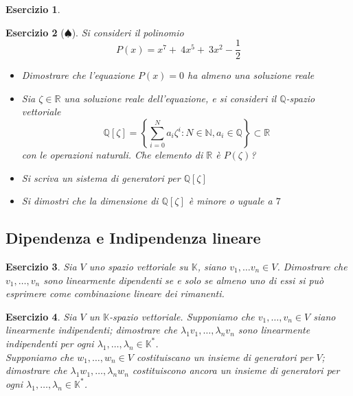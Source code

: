 \documentclass{article}
\newtheorem{es}{Esercizio}
\begin{document}
{\begin{es}
    
    
\end{es}





\begin{es}[$\spadesuit$]
    Si consideri il polinomio $$
    P(x)=x^7+\ 4x^5+\ 3x^2-\frac{1}{2}$$
    \begin{itemize}
        \item Dimostrare che l'equazione $P(x)=0$ ha almeno una soluzione reale
        \item Sia $\zeta\in\mathbb{R}$ una soluzione reale dell'equazione, e si consideri il $\mathbb{Q}$-spazio vettoriale
        $$\mathbb{Q}[\zeta]=\left\{\sum_{i=0}^N a_i\zeta^i:N\in \mathbb{N}, a_i\in \mathbb{Q}\right\}\subset \mathbb{R}$$
        con le operazioni naturali. Che elemento di $\mathbb{R}$ è $P(\zeta)$?
        \item Si scriva un sistema di generatori per $\mathbb{Q}[\zeta]$
        \item Si dimostri che la dimensione di $\mathbb{Q}[\zeta]$ è minore o uguale a $7$
    \end{itemize}
\end{es}



\subsection{Dipendenza e Indipendenza lineare}
\begin{es}
    Sia $V$ uno spazio vettoriale su $\mathbb{K}$, siano $v_1,\dots v_n \in V$. Dimostrare che $v_1,\dots, v_n$ sono linearmente dipendenti se e solo se almeno uno di essi si può esprimere come combinazione lineare dei rimanenti.
\end{es}

\begin{es}
    Sia $V$ un $\mathbb{K}$-spazio vettoriale. Supponiamo che $v_1,\dots, v_n \in V$ siano linearmente indipendenti; dimostrare che $\lambda_1v_1,\dots ,\lambda_nv_n$ sono linearmente indipendenti per ogni $\lambda_1,\dots ,\lambda_n \in \mathbb{K}^*$.\\
    Supponiamo che $w_1,\dots, w_n \in V$ costituiscano un insieme di generatori per $V$; dimostrare che $\lambda_1w_1,\dots ,\lambda_nw_n$ costituiscono ancora un insieme di generatori per ogni $\lambda_1,\dots ,\lambda_n \in \mathbb{K}^*$.
    
\end{es}



}
\end{document}
